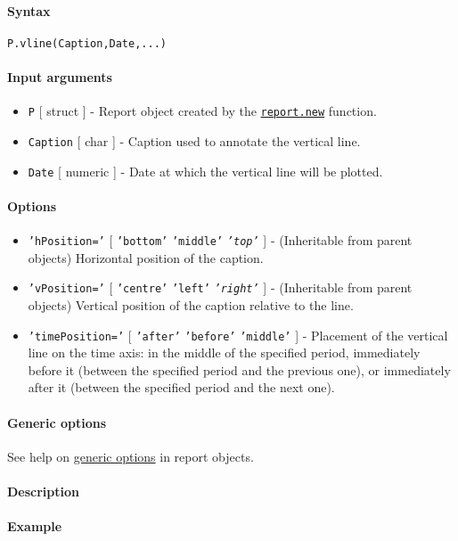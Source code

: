 


	\paragraph{Syntax}

\begin{verbatim}
P.vline(Caption,Date,...)
\end{verbatim}

\paragraph{Input arguments}

\begin{itemize}
\item
  \texttt{P} {[} struct {]} - Report object created by the
  \href{report/new}{\texttt{report.new}} function.
\item
  \texttt{Caption} {[} char {]} - Caption used to annotate the vertical
  line.
\item
  \texttt{Date} {[} numeric {]} - Date at which the vertical line will
  be plotted.
\end{itemize}

\paragraph{Options}

\begin{itemize}
\item
  \texttt{'hPosition='} {[} \texttt{'bottom'} \textbar{}
  \texttt{'middle'} \textbar{} \emph{\texttt{'top'}} {]} - (Inheritable
  from parent objects) Horizontal position of the caption.
\item
  \texttt{'vPosition='} {[} \texttt{'centre'} \textbar{} \texttt{'left'}
  \textbar{} \emph{\texttt{'right'}} {]} - (Inheritable from parent
  objects) Vertical position of the caption relative to the line.
\item
  \texttt{'timePosition='} {[} \texttt{'after'} \textbar{}
  \texttt{'before'} \textbar{} \texttt{'middle'} {]} - Placement of the
  vertical line on the time axis: in the middle of the specified period,
  immediately before it (between the specified period and the previous
  one), or immediately after it (between the specified period and the
  next one).
\end{itemize}

\paragraph{Generic options}

See help on \href{report/Contents}{generic options} in report objects.

\paragraph{Description}

\paragraph{Example}


